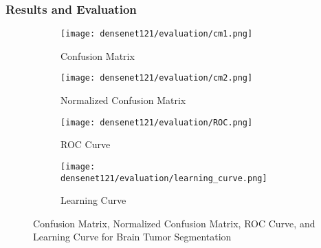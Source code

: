 \subsubsection{Results and Evaluation}

\begin{figure}[H]
  \centering
  \begin{subfigure}[b]{0.2\textwidth}
    \centering
    \texttt{[image: densenet121/evaluation/cm1.png]}
    \caption{Confusion Matrix}
    \label{fig:densenet121_cm1}
  \end{subfigure}
  \hfill
  \begin{subfigure}[b]{0.2\textwidth}
    \centering
    \texttt{[image: densenet121/evaluation/cm2.png]}
    \caption{Normalized Confusion Matrix}
    \label{fig:densenet121_cm2}
  \end{subfigure}
  \hfill
  \begin{subfigure}[b]{0.25\textwidth}
    \centering
    \texttt{[image: densenet121/evaluation/ROC.png]}
    \caption{ROC Curve}
    \label{fig:densenet121_roc}
  \end{subfigure}
  \hfill
  \begin{subfigure}[b]{0.25\textwidth}
    \centering
    \texttt{[image: densenet121/evaluation/learning\_curve.png]}
    \caption{Learning Curve}
    \label{fig:densenet121_learning_curve}
  \end{subfigure}
  \caption{Confusion Matrix, Normalized Confusion Matrix, ROC Curve, and Learning Curve for Brain Tumor Segmentation}
  \label{fig:densenet121_evaluation}
\end{figure}

